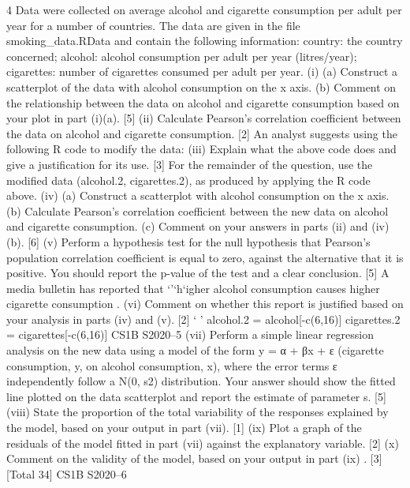 \documentclass[a4paper,12pt]{article}
\begin{document}
\large 
\noindent

4 Data were collected on average alcohol and cigarette consumption per adult per year
for a number of countries. The data are given in the file smoking_data.RData
and contain the following information:
country: the country concerned;
alcohol: alcohol consumption per adult per year (litres/year);
cigarettes: number of cigarettes consumed per adult per year.
(i) (a) Construct a scatterplot of the data with alcohol consumption on the
x axis.
(b) Comment on the relationship between the data on alcohol and cigarette
consumption based on your plot in part (i)(a).
[5]
(ii) Calculate Pearson’s correlation coefficient between the data on alcohol and
cigarette consumption. [2]
An analyst suggests using the following R code to modify the data:
(iii) Explain what the above code does and give a justification for its use. [3]
For the remainder of the question, use the modified data
(alcohol.2, cigarettes.2), as produced by applying the R
code above.
(iv) (a) Construct a scatterplot with alcohol consumption on the x axis.
(b) Calculate Pearson’s correlation coefficient between the new data on
alcohol and cigarette consumption.
(c) Comment on your answers in parts (ii) and (iv)(b).
[6]
(v) Perform a hypothesis test for the null hypothesis that Pearson’s population
correlation coefficient is equal to zero, against the alternative that it is positive.
You should report the p-value of the test and a clear conclusion. [5]
A media bulletin has reported that ‘'‘h‘igher alcohol consumption causes higher
cigarette consumption .
(vi) Comment on whether this report is justified based on your analysis in parts (iv)
and (v). [2]
‘
’
alcohol.2 = alcohol[-c(6,16)]
cigarettes.2 = cigarettes[-c(6,16)]
CS1B S2020–5
(vii) Perform a simple linear regression analysis on the new data using a
model of the form y = α + βx + ε (cigarette consumption, y, on alcohol
consumption, x), where the error terms ε independently follow a
N(0, s2) distribution.
Your answer should show the fitted line plotted on the data scatterplot
and report the estimate of parameter s. [5]
(viii) State the proportion of the total variability of the responses explained
by the model, based on your output in part (vii). [1]
(ix) Plot a graph of the residuals of the model fitted in part (vii)
against the explanatory variable. [2]
(x) Comment on the validity of the model, based on your output in
part (ix) . [3]
[Total 34]
CS1B S2020–6
\end{document}
